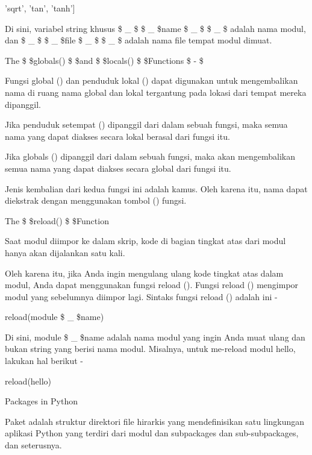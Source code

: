 \noindent 
 \hspace*{0.5in} 'sqrt', 'tan', 'tanh'] \par
\noindent 
Di sini, variabel string khusus  \$  \_  \$ \$  \_  \$name \$  \_  \$ \$  \_  \$ adalah nama modul, dan  \$  \_  \$ \$  \_  \$file \$  \_  \$ \$  \_  \$ adalah nama file tempat modul dimuat. \par
\vspace{12pt}
\noindent 
The \$  \$globals() \$  \$and \$  \$locals() \$  \$Functions  \$ - \$ \par
\noindent 
Fungsi global () dan penduduk lokal () dapat digunakan untuk mengembalikan nama di ruang nama global dan lokal tergantung pada lokasi dari tempat mereka dipanggil. \par
\noindent 
Jika penduduk setempat () dipanggil dari dalam sebuah fungsi, maka semua nama yang dapat diakses secara lokal berasal dari fungsi itu. \par
\noindent 
Jika globals () dipanggil dari dalam sebuah fungsi, maka akan mengembalikan semua nama yang dapat diakses secara global dari fungsi itu. \par
\noindent 
Jenis kembalian dari kedua fungsi ini adalah kamus. Oleh karena itu, nama dapat diekstrak dengan menggunakan tombol () fungsi. \par
\vspace{12pt}
\noindent 
The \$  \$reload() \$  \$Function \par
\noindent 
Saat modul diimpor ke dalam skrip, kode di bagian tingkat atas dari modul hanya akan dijalankan satu kali. \par
\noindent 
Oleh karena itu, jika Anda ingin mengulang ulang kode tingkat atas dalam modul, Anda dapat menggunakan fungsi reload (). Fungsi reload () mengimpor modul yang sebelumnya diimpor lagi. Sintaks fungsi reload () adalah ini - \par
\noindent 
 \hspace*{0.5in} reload(module \$  \_  \$name) \par
\noindent 
Di sini, module \$  \_  \$name adalah nama modul yang ingin Anda muat ulang dan bukan string yang berisi nama modul. Misalnya, untuk me-reload modul hello, lakukan hal berikut - \par
\noindent 
 \hspace*{0.5in} reload(hello) \par
\vspace{12pt}
\noindent 
Packages in Python \par
\noindent 
Paket adalah struktur direktori file hirarkis yang mendefinisikan satu lingkungan aplikasi Python yang terdiri dari modul dan subpackages dan sub-subpackages, dan seterusnya. \par
